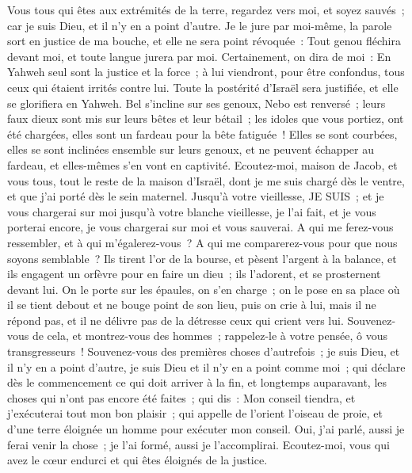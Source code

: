 \begin{multicols}{2}
Vous tous qui êtes aux extrémités de la terre, regardez vers moi, et soyez sauvés~; car je suis Dieu, et il n'y en a point d'autre.
Je le jure par moi-même, la parole sort en justice de ma bouche, et elle ne sera point révoquée~: Tout genou fléchira devant moi, et toute langue jurera par moi.
Certainement, on dira de moi~: En Yahweh seul sont la justice et la force~; à lui viendront, pour être confondus, tous ceux qui étaient irrités contre lui.
Toute la postérité d'Israël sera justifiée, et elle se glorifiera en Yahweh.
\VerseOne{}Bel s'incline sur ses genoux, Nebo est renversé~; leurs faux dieux sont mis sur leurs bêtes et leur bétail~; les idoles que vous portiez, ont été chargées, elles sont un fardeau pour la bête fatiguée~!
Elles se sont courbées, elles se sont inclinées ensemble sur leurs genoux, et ne peuvent échapper au fardeau, et elles-mêmes s'en vont en captivité.
Ecoutez-moi, maison de Jacob, et vous tous, tout le reste de la maison d'Israël, dont je me suis chargé dès le ventre, et que j'ai porté dès le sein maternel.
Jusqu'à votre vieillesse, JE SUIS~; et je vous chargerai sur moi jusqu'à votre blanche vieillesse, je l'ai fait, et je vous porterai encore, je vous chargerai sur moi et vous sauverai.
A qui me ferez-vous ressembler, et à qui m'égalerez-vous~? A qui me comparerez-vous pour que nous soyons semblable~? 
Ils tirent l'or de la bourse, et pèsent l'argent à la balance, et ils engagent un orfèvre pour en faire un dieu~; ils l'adorent, et se prosternent devant lui.
On le porte sur les épaules, on s'en charge~; on le pose en sa place où il se tient debout et ne bouge point de son lieu, puis on crie à lui, mais il ne répond pas, et il ne délivre pas de la détresse ceux qui crient vers lui.
Souvenez-vous de cela, et montrez-vous des hommes~; rappelez-le à votre pensée, ô vous transgresseurs~!
Souvenez-vous des premières choses d'autrefois~; je suis Dieu, et il n'y en a point d'autre, je suis Dieu et il n'y en a point comme moi~;
qui déclare dès le commencement ce qui doit arriver à la fin, et longtemps auparavant, les choses qui n'ont pas encore été faites~; qui dis~: Mon conseil tiendra, et j'exécuterai tout mon bon plaisir~;
qui appelle de l'orient l'oiseau de proie, et d'une terre éloignée un homme pour exécuter mon conseil. Oui, j'ai parlé, aussi je ferai venir la chose~; je l'ai formé, aussi je l'accomplirai. 
Ecoutez-moi, vous qui avez le cœur endurci et qui êtes éloignés de la justice.

\end{multicols}
